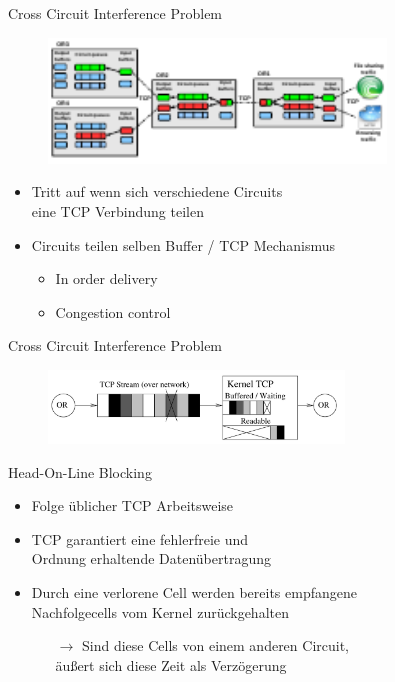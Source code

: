 \documentclass{beamer}
\begin{document}
\begin{frame}{Cross Circuit Interference Problem}{\secname}
  \begin{figure}
    \includegraphics[width=0.8\textwidth]{pics/BufferPic.pdf}
  \end{figure}
  \begin{itemize}
    \item Tritt auf wenn sich verschiedene Circuits\\ eine TCP Verbindung teilen 
    \item Circuits teilen selben Buffer / TCP Mechanismus
    \begin{itemize}
      \item In order delivery
      \item Congestion control
    \end{itemize}
  \end{itemize}
\end{frame}


\begin{frame}{Cross Circuit Interference Problem}{\secname}
  \begin{figure}
    \includegraphics[width=0.7\textwidth]{pics/headonlinevanilla.pdf}
  \end{figure}
  \begin{block}{Head-On-Line Blocking}
    \begin{itemize}
      \item Folge üblicher TCP Arbeitsweise
      \item TCP garantiert eine fehlerfreie und\\Ordnung erhaltende Datenübertragung
      \item Durch eine verlorene Cell werden bereits empfangene\\Nachfolgecells vom Kernel zurückgehalten 
      \begin{itemize}
        \item[$\rightarrow$] Sind diese Cells von einem anderen Circuit,\\äußert sich diese Zeit als Verzögerung
      \end{itemize}
    \end{itemize}
  \end{block}
\end{frame}
\end{document}

